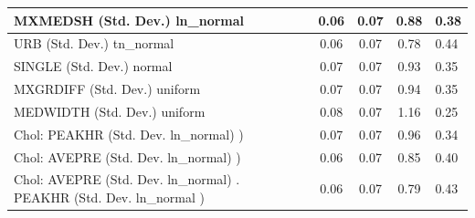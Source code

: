 \begin{table}
\begin{center}
\begin{tabular}{|l|l|c|c|c|l|}
			\hline
			MXMEDSH (Std. Dev.) ln_normal &  & 0.06 & 0.07 & 0.88 & 0.38 \\
			\hline
			URB (Std. Dev.) tn_normal &  & 0.06 & 0.07 & 0.78 & 0.44 \\
			\hline
			SINGLE (Std. Dev.) normal &  & 0.07 & 0.07 & 0.93 & 0.35 \\
			\hline
			MXGRDIFF (Std. Dev.) uniform &  & 0.07 & 0.07 & 0.94 & 0.35 \\
			\hline
			MEDWIDTH (Std. Dev.) uniform &  & 0.08 & 0.07 & 1.16 & 0.25 \\
			\hline
			 Chol: PEAKHR (Std. Dev. ln_normal) ) &  & 0.07 & 0.07 & 0.96 & 0.34 \\
			\hline
			 Chol: AVEPRE (Std. Dev. ln_normal) ) &  & 0.06 & 0.07 & 0.85 & 0.40 \\
			\hline
			 Chol: AVEPRE (Std. Dev. ln_normal) . PEAKHR (Std. Dev.   ln_normal ) &  & 0.06 & 0.07 & 0.79 & 0.43 \\
			\hline
		\end{tabular}
	\end{center}
\end{table}